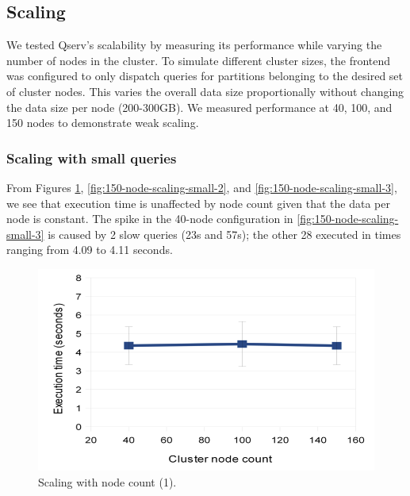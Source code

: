 \documentclass[DM,toc]{lsstdoc}
\begin{document}
\subsection{Scaling}\label{scaling}

We tested Qserv's scalability by measuring its performance while varying
the number of nodes in the cluster. To simulate different cluster sizes,
the frontend was configured to only dispatch queries for partitions
belonging to the desired set of cluster nodes. This varies the overall
data size proportionally without changing the data size per node
(200-300GB). We measured performance at 40, 100, and 150 nodes to
demonstrate weak scaling.

\subsubsection{Scaling with small queries}\label{scaling-with-small-queries}

From Figures \ref{fig:150-node-scaling-small-1}, \ref{fig:150-node-scaling-small-2}, and \ref{fig:150-node-scaling-small-3}, we
see that execution time is unaffected by node count given that the data
per node is constant. The spike in the 40-node configuration in
\ref{fig:150-node-scaling-small-3} is caused by 2 slow queries (23s and 57s);
the other 28 executed in times ranging from 4.09 to 4.11 seconds.

\begin{figure}[H]
\centering
\includegraphics{_static/150_node_scaling_small_1}
\caption{Scaling with node count (1).}
\label{fig:150-node-scaling-small-1}
\end{figure}
\end{document}
